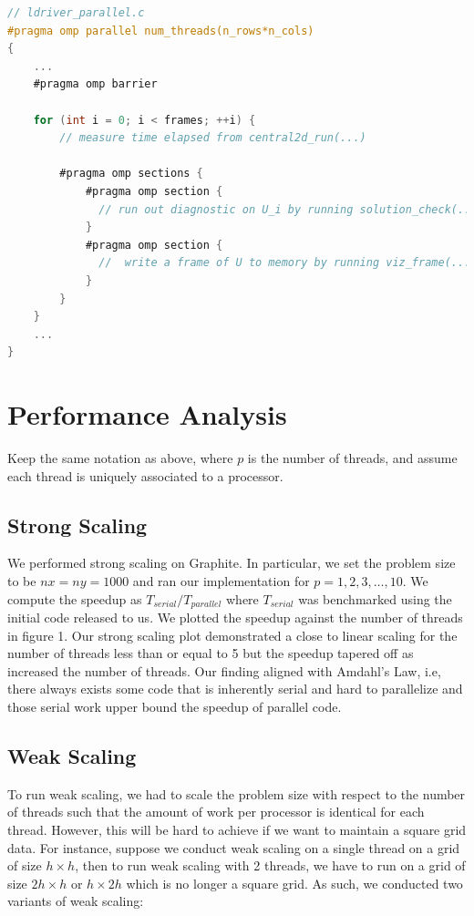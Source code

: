 \documentclass{article}
\begin{document}
\begin{lstlisting}[language=C]
// ldriver_parallel.c
#pragma omp parallel num_threads(n_rows*n_cols)
{
    ...
    #pragma omp barrier

    for (int i = 0; i < frames; ++i) {
        // measure time elapsed from central2d_run(...)

        #pragma omp sections {
            #pragma omp section {
              // run out diagnostic on U_i by running solution_check(...)
            }
            #pragma omp section {
              //  write a frame of U to memory by running viz_frame(...);
            }
        }
    }
    ...
}
\end{lstlisting}

\section{Performance Analysis}

Keep the same notation as above, where $p$ is the number of threads, and assume each thread is uniquely associated to a processor.

\subsection{Strong Scaling}

We performed strong scaling on Graphite. In particular, we set the problem size to be $nx = ny = 1000$ and ran our implementation for $p = 1, 2, 3, \ldots, 10$. We compute the speedup as $T_{serial} / T_{parallel}$ where $T_{serial}$ was benchmarked using the initial code released to us. We plotted the speedup against the number of threads in figure 1. Our strong scaling plot demonstrated a close to linear scaling for the number of threads less than or equal to 5 but the speedup tapered off as increased the number of threads. Our finding aligned with Amdahl’s Law, i.e, there always exists some code that is inherently serial and hard to parallelize and those serial work upper bound the speedup of parallel code.

\subsection{Weak Scaling}
To run weak scaling, we had to scale the problem size with respect to the number of threads such that the amount of work per processor is identical for each thread. However, this will be hard to achieve if we want to maintain a square grid data. For instance, suppose we conduct weak scaling on a single thread on a grid of size $h \times h$, then to run weak scaling with 2 threads, we have to run on a grid of size $2h \times h$ or $h \times 2h$ which is no longer a square grid. As such, we conducted two variants of weak scaling:
\end{document}
